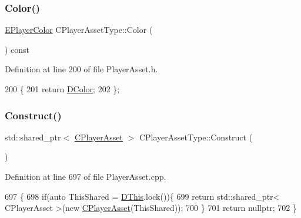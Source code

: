 \subsubsection{\texorpdfstring{Color()}{Color()}}
{\footnotesize\ttfamily \hyperlink{GameDataTypes_8h_aafb0ca75933357ff28a6d7efbdd7602f}{E\+Player\+Color} C\+Player\+Asset\+Type\+::\+Color (\begin{DoxyParamCaption}{ }\end{DoxyParamCaption}) const\hspace{0.3cm}{\ttfamily [inline]}}



Definition at line 200 of file Player\+Asset.\+h.


\begin{DoxyCode}
200                                   \{
201             \textcolor{keywordflow}{return} \hyperlink{classCPlayerAssetType_abd32b27281bcf17a611802aef148462b}{DColor};  
202         \};
\end{DoxyCode}
\hypertarget{classCPlayerAssetType_a33174deef7e3b4a79e3a83e502f75d38}{}\label{classCPlayerAssetType_a33174deef7e3b4a79e3a83e502f75d38} 
\subsubsection{\texorpdfstring{Construct()}{Construct()}}
{\footnotesize\ttfamily std\+::shared\+\_\+ptr$<$ \hyperlink{classCPlayerAsset}{C\+Player\+Asset} $>$ C\+Player\+Asset\+Type\+::\+Construct (\begin{DoxyParamCaption}{ }\end{DoxyParamCaption})}



Definition at line 697 of file Player\+Asset.\+cpp.


\begin{DoxyCode}
697                                                          \{
698     \textcolor{keywordflow}{if}(\textcolor{keyword}{auto} ThisShared = \hyperlink{classCPlayerAssetType_ae0d263de96ccad929d79d6b46f7b8deb}{DThis}.lock())\{
699         \textcolor{keywordflow}{return} std::shared\_ptr< CPlayerAsset >(\textcolor{keyword}{new} \hyperlink{classCPlayerAsset}{CPlayerAsset}(ThisShared));
700     \}        
701     \textcolor{keywordflow}{return} \textcolor{keyword}{nullptr};
702 \}
\end{DoxyCode}
\hypertarget{classCPlayerAssetType_aef20d622ca84065ce95162eaecc4c31d}{}\label{classCPlayerAssetType_aef20d622ca84065ce95162eaecc4c31d} 
